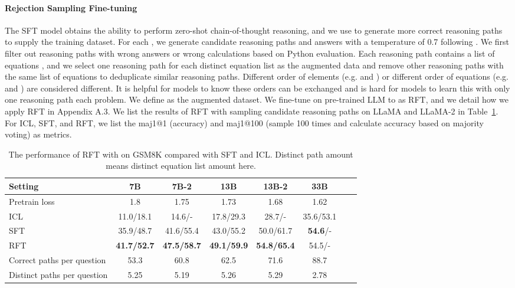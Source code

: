 \documentclass{article} \usepackage{iclr2021_conference,times}
\begin{document}
\paragraph{Rejection Sampling Fine-tuning} The SFT model  obtains the ability to perform zero-shot chain-of-thought reasoning, and we use  to generate more correct reasoning paths  to supply the training dataset. 
For each , we generate  candidate reasoning paths and answers  with a temperature of 0.7 following \citep{gsm8k}.
We first filter out reasoning paths with wrong answers  or wrong calculations based on Python evaluation.
Each reasoning path contains a list of equations , and we select one reasoning path  for each distinct equation list as the augmented  data and remove other reasoning paths with the same list of equations to deduplicate similar reasoning paths.  
Different order of elements (e.g.  and ) or different order of equations (e.g.  and ) are considered different. 
It is helpful for models to know these orders can be exchanged and is hard for models to learn this with only one reasoning path each problem.
We define  as the augmented dataset. We fine-tune  on pre-trained LLM  to  as RFT, and we detail how we apply RFT in Appendix A.3.
We list the results of RFT with sampling  candidate reasoning paths on LLaMA and LLaMA-2 in Table~\ref{tab:rft-main}. For ICL, SFT, and RFT, we list the maj1@1 (accuracy) and maj1@100 (sample 100 times and calculate accuracy based on majority voting) as metrics.

\begin{table}[t]
    \small
    \centering
    \begin{tabular}{l|ccccccc}
  \hline
  Setting & 7B & 7B-2 & 13B & 13B-2  & 33B \\
  \hline
  Pretrain loss & 1.8& 1.75& 1.73& 1.68& 1.62 \\
  \hline
  ICL & 11.0/18.1 & 14.6/- & 17.8/29.3&28.7/-&35.6/53.1\\
  SFT &35.9/48.7& 41.6/55.4 & 43.0/55.2 & 50.0/61.7 & \textbf{54.6}/-& \\
  \hline
  RFT & \textbf{41.7/52.7} & \textbf{47.5/58.7} & \textbf{49.1/59.9} & \textbf{54.8/65.4}&54.5/-\\
  Correct paths per question & 53.3 & 60.8 & 62.5 & 71.6 & 88.7 \\
  Distinct paths per question & 5.25 & 5.19 & 5.26 & 5.29 & 2.78 \\
  \hline
    \end{tabular}
    \caption{The performance of RFT with  on GSM8K compared with SFT and ICL. Distinct path amount means distinct equation list amount here.}
    \label{tab:rft-main}
\end{table}
\end{document}
